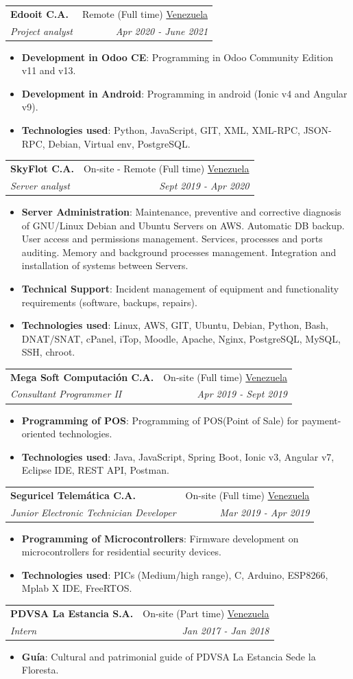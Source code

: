 \documentclass[a4paper,20pt]{article}
\makeatletter
\newcommand{\resumeItem}[2]{
  \item\small{
    \textbf{#1}{: #2 \vspace{-2pt}}
  }
}
\newcommand{\resumeSubheading}[4]{
  \vspace{-1pt}\item
    \begin{tabular*}{0.97\textwidth}{l@{\extracolsep{\fill}}r}
      \textbf{#1} & #2 \\
      \textit{#3} & \textit{#4} \\
    \end{tabular*}\vspace{-5pt}
}
\newcommand{\resumeItemListStart}{\begin{itemize}}
\newcommand{\resumeItemListEnd}{\end{itemize}\vspace{-5pt}}
\makeatother
\begin{document}
    \resumeSubheading{Edooit C.A.}{Remote (Full time) \underline{Venezuela}}
    {Project analyst}{Apr 2020 - June 2021}
    \resumeItemListStart
        \resumeItem{Development in Odoo CE}
          {Programming in Odoo Community Edition v11 and v13.}
          \resumeItem{Development in Android}
          {Programming in android (Ionic v4 and Angular v9).}
          \resumeItem{Technologies used}{Python, JavaScript, GIT, XML, XML-RPC, JSON-RPC, Debian, Virtual env, PostgreSQL.}
      \resumeItemListEnd
\vspace{10pt}
    \resumeSubheading
		{SkyFlot C.A.}{On-site - Remote (Full time) \underline{Venezuela}}
		{Server analyst}{Sept 2019 -  Apr 2020}
		\resumeItemListStart
        \resumeItem{Server Administration}
          {Maintenance, preventive and corrective diagnosis of GNU/Linux Debian and Ubuntu Servers on AWS. Automatic DB backup. User access and permissions management. Services, processes and ports auditing. Memory and background processes management. Integration and installation of systems between Servers.}
        \resumeItem{Technical Support}
           {Incident management of equipment and functionality requirements (software, backups, repairs).}
        \resumeItem{Technologies used}{Linux, AWS, GIT, Ubuntu, Debian, Python, Bash, DNAT/SNAT, cPanel, iTop, Moodle, Apache, Nginx, PostgreSQL, MySQL, SSH, chroot.}
		\resumeItemListEnd
		
\vspace{10pt}
    \resumeSubheading
		{Mega Soft Computación C.A.}{On-site (Full time) \underline{Venezuela}}
		{Consultant Programmer II}{Apr 2019 -  Sept 2019}
\resumeItemListStart
        \resumeItem{Programming of POS}
          {Programming of POS(Point of Sale) for payment-oriented technologies.}
          \resumeItem{Technologies used}{Java, JavaScript, Spring Boot, Ionic v3, Angular v7, Eclipse IDE, REST API, Postman.}
      \resumeItemListEnd
\vspace{10pt}
    \resumeSubheading
		{Seguricel Telemática C.A.}{On-site (Full time) \underline{Venezuela}}
		{Junior Electronic Technician Developer}{Mar 2019 -  Apr 2019}
\resumeItemListStart
        \resumeItem{Programming of Microcontrollers}
          {Firmware development on microcontrollers for residential security devices.}
          \resumeItem{Technologies used}{PICs (Medium/high range), C, Arduino, ESP8266, Mplab X IDE, FreeRTOS.}
      \resumeItemListEnd
      
      \vspace{10pt}
    \resumeSubheading
		{PDVSA La Estancia S.A.}{On-site (Part time) \underline{Venezuela}}
		{Intern}{Jan 2017 -  Jan 2018}
\resumeItemListStart
        \resumeItem{Guía}
          {Cultural and patrimonial guide of PDVSA La Estancia Sede la Floresta.}
      \resumeItemListEnd
\end{document}
